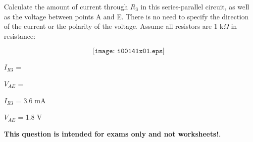 

Calculate the amount of current through $R_3$ in this series-parallel circuit, as well as the voltage between points A and E.  There is no need to specify the direction of the current or the polarity of the voltage.  Assume all resistors are 1 k$\Omega$ in resistance:

$$\texttt{[image: i00141x01.eps]}$$

$I_{R3}$ = 

\vskip 10pt

$V_{AE}$ = 

\vskip 10pt







$I_{R3}$ = 3.6 mA

\vskip 10pt

$V_{AE}$ = 1.8 V







{\bf This question is intended for exams only and not worksheets!}.



